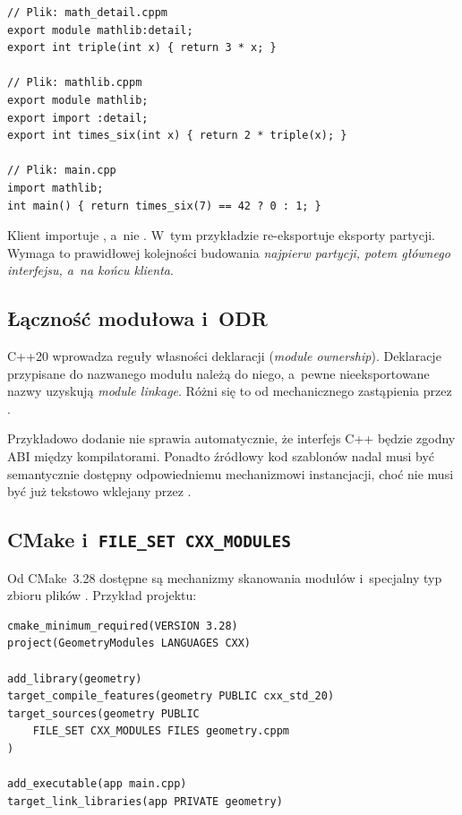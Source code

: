 \begin{lstlisting}[caption={Dwie jednostki interfejsu modułu z partycją.}]
// Plik: math_detail.cppm
export module mathlib:detail;
export int triple(int x) { return 3 * x; }

// Plik: mathlib.cppm
export module mathlib;
export import :detail;
export int times_six(int x) { return 2 * triple(x); }

// Plik: main.cpp
import mathlib;
int main() { return times_six(7) == 42 ? 0 : 1; }
\end{lstlisting}

Klient importuje , a~nie .
W~tym przykładzie  re-eksportuje
eksporty partycji. Wymaga to prawidłowej kolejności budowania
\emph{najpierw partycji, potem głównego interfejsu, a~na końcu klienta}.

\subsection{Łączność modułowa i~ODR}

C++20 wprowadza reguły własności deklaracji (\emph{module ownership}).
Deklaracje przypisane do nazwanego modułu należą do niego, a~pewne
nieeksportowane nazwy uzyskują \emph{module linkage}. Różni się to od
mechanicznego zastąpienia  przez .

Przykładowo dodanie  nie sprawia automatycznie, że
interfejs C++ będzie zgodny ABI między kompilatorami. Ponadto
źródłowy kod szablonów nadal musi być semantycznie dostępny
odpowiedniemu mechanizmowi instancjacji, choć nie musi być już
tekstowo wklejany przez .

\subsection{CMake i~\texttt{FILE\_SET CXX\_MODULES}}

Od CMake~3.28 dostępne są mechanizmy skanowania modułów i~specjalny
typ zbioru plików . Przykład projektu:

\begin{lstlisting}[language={},caption={CMakeLists.txt projektu korzystającego z modułów C++20.}]
cmake_minimum_required(VERSION 3.28)
project(GeometryModules LANGUAGES CXX)

add_library(geometry)
target_compile_features(geometry PUBLIC cxx_std_20)
target_sources(geometry PUBLIC
    FILE_SET CXX_MODULES FILES geometry.cppm
)

add_executable(app main.cpp)
target_link_libraries(app PRIVATE geometry)
\end{lstlisting}

